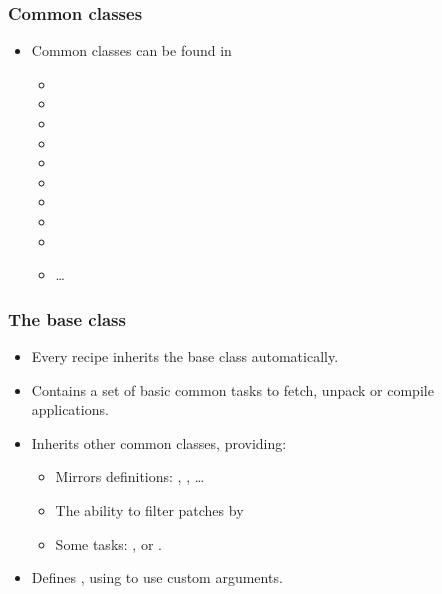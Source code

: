 \begin{frame}
  \frametitle{Common classes}
  \begin{itemize}
    \item Common classes can be found in 
    \begin{itemize}
      \item {}
      \item {}
      \item {}
      \item {}
      \item {}
      \item {}
      \item {}
      \item {}
      \item {}
      \item \dots
    \end{itemize}
  \end{itemize}
\end{frame}

\begin{frame}
  \frametitle{The base class}
  \begin{itemize}
    \item Every recipe inherits the base class automatically.
    \item Contains a set of basic common tasks to fetch, unpack or
          compile applications.
    \item Inherits other common classes, providing:
    \begin{itemize}
      \item Mirrors definitions: ,
            , \dots
      \item The ability to filter patches by 
      \item Some tasks: ,  or
            .
    \end{itemize}
    \item Defines , using  to use
      custom arguments.
  \end{itemize}
\end{frame}

